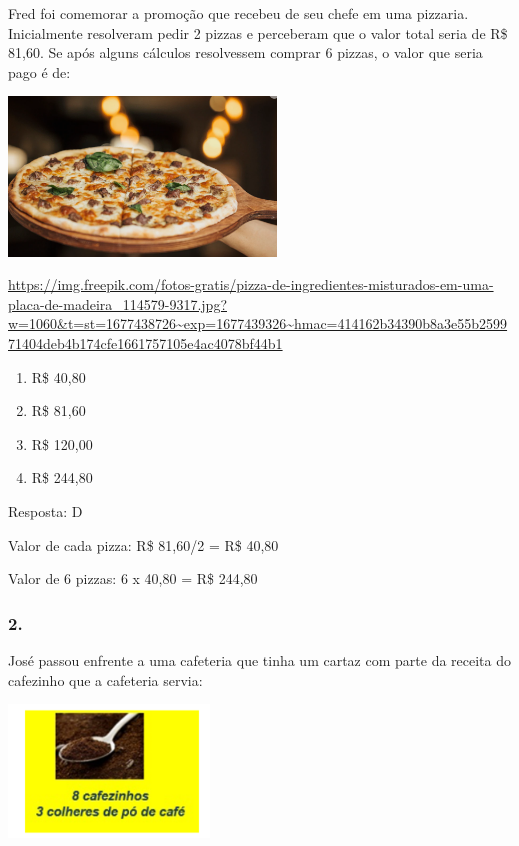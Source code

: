 Fred foi comemorar a promoção que recebeu de seu chefe em uma pizzaria.
Inicialmente resolveram pedir 2 pizzas e perceberam que o valor total
seria de R\$ 81,60. Se após alguns cálculos resolvessem comprar 6
pizzas, o valor que seria pago é de:

\includegraphics[width=2.80000in,height=1.66867in]{media/image132.png}

\url{https://img.freepik.com/fotos-gratis/pizza-de-ingredientes-misturados-em-uma-placa-de-madeira_114579-9317.jpg?w=1060\&t=st=1677438726~exp=1677439326~hmac=414162b34390b8a3e55b259971404deb4b174cfe1661757105e4ac4078bf44b1}

\begin{enumerate}
\def\labelenumi{\alph{enumi})}
\item
  R\$ 40,80
\item
  R\$ 81,60
\item
  R\$ 120,00
\item
  R\$ 244,80
\end{enumerate}

Resposta: D

Valor de cada pizza: R\$ 81,60/2 = R\$ 40,80

Valor de 6 pizzas: 6 x 40,80 = R\$ 244,80

\subsubsection{2.}\label{section-128}

José passou enfrente a uma cafeteria que tinha um cartaz com parte da
receita do cafezinho que a cafeteria servia:

\includegraphics[width=2.10018in,height=1.39179in]{media/image133.png}

